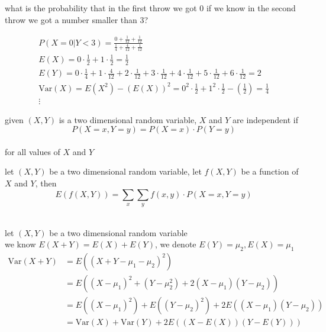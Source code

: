 \documentclass[11pt]{article}
\begin{document}
\begin{definition}
\begin{my_example}
what is the probability that in the first throw we got 0 if we know in the second throw we got a number smaller than 3?\\[0pt]
\begin{answer}
\begin{gather*}
P(X=0|Y<3)=\frac{0+\frac{1}{12}+\frac{1}{12}}{\frac{1}{4}+\frac{4}{12}+\frac{1}{12}}\\
E(X)=0 \cdot \frac{1}{2} + 1 \cdot \frac{1}{2} = \frac{1}{2}\\
E(Y)=0 \cdot \frac{1}{4} + 1 \cdot \frac{4}{12} + 2 \cdot \frac{1}{12} + 3 \cdot \frac{1}{12} + 4 \cdot \frac{1}{12} + 5 \cdot \frac{1}{12} + 6 \cdot \frac{1}{12} = 2\\
\mathrm{Var}(X)=E(X^2)-(E(X))^2=0^2 \cdot \frac{1}{2} + 1^2 \cdot \frac{1}{2} - \left(\frac{1}{2}\right) = \frac{1}{4}\\
\vdots
\end{gather*}
\end{answer}
\end{my_example}
\begin{characteristic}
given \((X,Y)\) is a two dimensional random variable, \(X\) and \(Y\) are independent if\\[0pt]
\[
P(X=x,Y=y)=P(X=x) \cdot P(Y=y)
\]\\[0pt]
for all values of \(X\) and \(Y\)\\[0pt]
\end{characteristic}
\begin{characteristic}
let \((X,Y)\) be a two dimensional random variable, let \(f(X,Y)\) be a function of \(X\) and \(Y\), then\\[0pt]
\[
E(f(X,Y)) = \sum_{x} \sum_{y} f(x,y) \cdot P(X=x,Y=y)
\]\\[0pt]
\end{characteristic}
\begin{characteristic}
let \((X,Y)\) be a two dimensional random variable\\[0pt]
we know \(E(X+Y)=E(X)+E(Y)\), we denote \(E(Y)=\mu_2,E(X)=\mu_1\)\\[0pt]
\begin{align*}
  \mathrm{Var}(X+Y) &= E\left(\left(X+Y-\mu_1-\mu_2\right)^2\right)\\
  &= E\left((X-\mu_1)^2+(Y-\mu_2^2)+2(X-\mu_1)(Y-\mu_2)\right)\\
  &= E\left((X-\mu_1)^2\right)+E\left(\left(Y-\mu_2\right)^2\right)+2E((X-\mu_1)(Y-\mu_2))\\
  &= \mathrm{Var}(X)+\mathrm{Var}(Y)+2E((X-E(X))(Y-E(Y)))
\end{align*}
\end{characteristic}
\end{definition}
\end{document}
